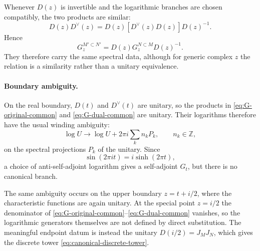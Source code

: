 \documentclass[a4paper,11pt]{article}
\theoremstyle{definition}
\begin{document}
Whenever $D(z)$ is invertible and the logarithmic branches are chosen
compatibly, the two products are similar:
\begin{equation}
    D(z)D^\vee(z)
    =
    D(z)
    \left[D^\vee(z)D(z)\right]
    D(z)^{-1}.
\end{equation}
Hence
\begin{equation}
    G_z^{M'\subset N'}
    =
    D(z)
    G_z^{N\subset M}
    D(z)^{-1}.
    \label{eq:G-similarity-common}
\end{equation}
They therefore carry the same spectral data, although for generic complex
$z$ the relation is a similarity rather than a unitary equivalence.

\paragraph{Boundary ambiguity.}
On the real boundary, $D(t)$ and $D^\vee(t)$ are unitary, so the products in
\eqref{eq:G-original-common} and \eqref{eq:G-dual-common} are unitary.
Their logarithms therefore have the usual winding ambiguity:
\begin{equation}
    \log U
    \longrightarrow
    \log U+2\pi i
    \sum_k n_kP_k,
    \qquad
    n_k\in\mathbb Z,
\end{equation}
on the spectral projections $P_k$ of the unitary. Since
\begin{equation}
    \sin(2\pi it)
    =
    i\sinh(2\pi t),
\end{equation}
a choice of anti-self-adjoint logarithm gives a self-adjoint $G_t$, but
there is no canonical branch.

The same ambiguity occurs on the upper boundary
$z=t+i/2$, where the characteristic functions are again unitary. At the
special point $z=i/2$ the denominator of
\eqref{eq:G-original-common}--\eqref{eq:G-dual-common} vanishes, so the
logarithmic generators themselves are not defined by direct substitution.
The meaningful endpoint datum is instead the unitary
$D(i/2)=J_MJ_N$, which gives the discrete tower
\eqref{eq:canonical-discrete-tower}.
\end{document}
